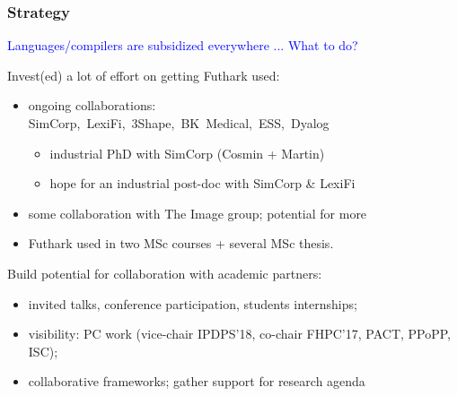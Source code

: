 \documentclass{beamer}
\newcommand{\blue}[1]{\textcolor{Blue}{{#1}}}
\newcommand{\emphh}[1]{\textcolor{CosGreen}{ #1}}
\begin{document}
\begin{frame}[fragile,t]
   \frametitle{Strategy}

\blue{Languages/compilers are subsidized everywhere ... What to do?}
\bigskip

\emphh{Invest(ed) a lot of effort on getting Futhark used:}\smallskip
\begin{itemize}
    \item ongoing collaborations: SimCorp,~LexiFi,~3Shape,~BK~Medical,~ESS,~Dyalog
    \begin{itemize}
        \item industrial PhD with SimCorp (Cosmin + Martin)
        \item hope for an industrial post-doc with SimCorp \& LexiFi\smallskip
    \end{itemize}
    \item some collaboration with The Image group; potential for more\smallskip
    \item Futhark used in two MSc courses + several MSc thesis.
\end{itemize}
\bigskip

\emphh{Build potential for collaboration with academic partners:}
\begin{itemize}
    \item invited talks, conference participation, students internships;
    \item visibility: PC work (vice-chair IPDPS'18, co-chair FHPC'17, PACT, PPoPP, ISC);
    \item collaborative frameworks; gather support for research agenda
\end{itemize} 

\end{frame}
\end{document}
